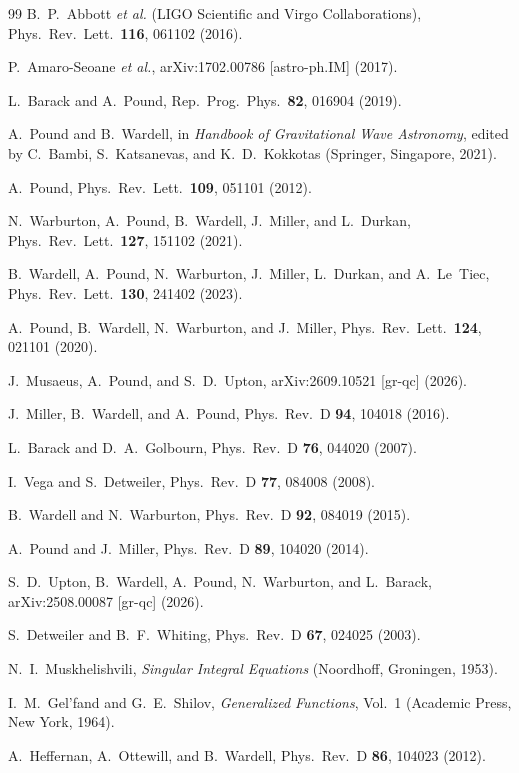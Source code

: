 \documentclass[aps,prd,twocolumn,superscriptaddress,nofootinbib,floatfix]{revtex4-2}
\begin{document}
\begin{thebibliography}{99}
B.~P.~Abbott \emph{et al.} (LIGO Scientific and Virgo Collaborations),
Phys.\ Rev.\ Lett.\ \textbf{116}, 061102 (2016).

P.~Amaro-Seoane \emph{et al.},
arXiv:1702.00786 [astro-ph.IM] (2017).

L.~Barack and A.~Pound,
Rep.\ Prog.\ Phys.\ \textbf{82}, 016904 (2019).

A.~Pound and B.~Wardell,
in \emph{Handbook of Gravitational Wave Astronomy}, edited by C.~Bambi, S.~Katsanevas, and K.~D.~Kokkotas (Springer, Singapore, 2021).

A.~Pound,
Phys.\ Rev.\ Lett.\ \textbf{109}, 051101 (2012).

N.~Warburton, A.~Pound, B.~Wardell, J.~Miller, and L.~Durkan,
Phys.\ Rev.\ Lett.\ \textbf{127}, 151102 (2021).

B.~Wardell, A.~Pound, N.~Warburton, J.~Miller, L.~Durkan, and A.~Le~Tiec,
Phys.\ Rev.\ Lett.\ \textbf{130}, 241402 (2023).

A.~Pound, B.~Wardell, N.~Warburton, and J.~Miller,
Phys.\ Rev.\ Lett.\ \textbf{124}, 021101 (2020).

J.~Musaeus, A.~Pound, and S.~D.~Upton,
arXiv:2609.10521 [gr-qc] (2026).

J.~Miller, B.~Wardell, and A.~Pound,
Phys.\ Rev.\ D \textbf{94}, 104018 (2016).

L.~Barack and D.~A.~Golbourn,
Phys.\ Rev.\ D \textbf{76}, 044020 (2007).

I.~Vega and S.~Detweiler,
Phys.\ Rev.\ D \textbf{77}, 084008 (2008).

B.~Wardell and N.~Warburton,
Phys.\ Rev.\ D \textbf{92}, 084019 (2015).

A.~Pound and J.~Miller,
Phys.\ Rev.\ D \textbf{89}, 104020 (2014).

S.~D.~Upton, B.~Wardell, A.~Pound, N.~Warburton, and L.~Barack,
arXiv:2508.00087 [gr-qc] (2026).

S.~Detweiler and B.~F.~Whiting,
Phys.\ Rev.\ D \textbf{67}, 024025 (2003).

N.~I.~Muskhelishvili,
\emph{Singular Integral Equations} (Noordhoff, Groningen, 1953).

I.~M.~Gel'fand and G.~E.~Shilov,
\emph{Generalized Functions}, Vol.~1 (Academic Press, New York, 1964).

A.~Heffernan, A.~Ottewill, and B.~Wardell,
Phys.\ Rev.\ D \textbf{86}, 104023 (2012).

\end{thebibliography}
\end{document}
